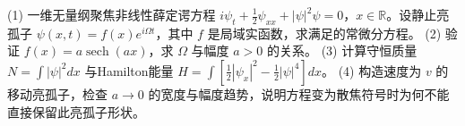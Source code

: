 (1) 一维无量纲聚焦非线性薛定谔方程 \(i\psi_t+\frac12\psi_{xx}+|\psi|^2\psi=0\)，\(x\in\mathbb R\)。设静止亮孤子 \(\psi(x,t)=f(x)e^{i\Omega t}\)，其中 \(f\) 是局域实函数，求满足的常微分方程。
(2) 验证 \(f(x)=a\operatorname{sech}(ax)\)，求 \(\Omega\) 与幅度 \(a>0\) 的关系。
(3) 计算守恒质量 \(N=\int|\psi|^2dx\) 与Hamilton能量 \(H=\int[\frac12|\psi_x|^2-\frac12|\psi|^4]dx\)。
(4) 构造速度为 \(v\) 的移动亮孤子，检查 \(a\to0\) 的宽度与幅度趋势，说明方程变为散焦符号时为何不能直接保留此亮孤子形状。
